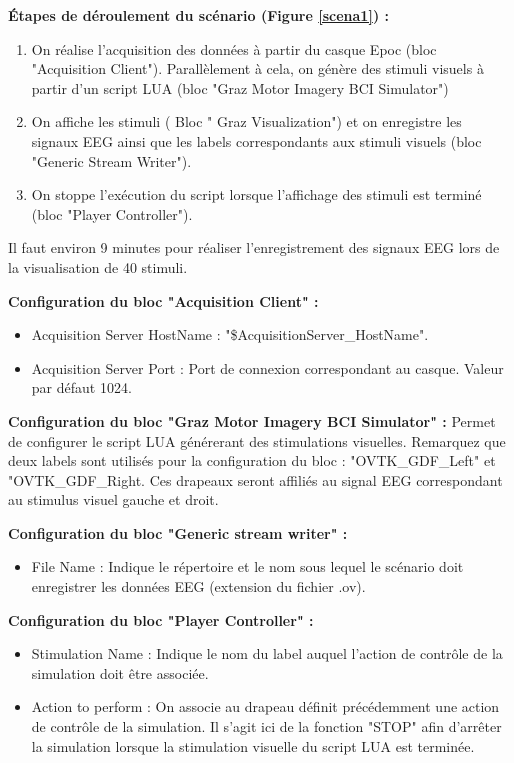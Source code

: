 \smallbreak
\textbf{Étapes de déroulement du scénario (Figure \ref{scena1}) : }
\smallbreak
\begin{enumerate}
	\item On réalise l'acquisition des données à partir du casque Epoc (bloc "Acquisition Client"). Parallèlement à cela, on génère des stimuli visuels à partir d'un script LUA (bloc "Graz Motor Imagery BCI Simulator")
	\smallbreak
	\item On affiche les stimuli ( Bloc " Graz Visualization") et on enregistre les signaux EEG ainsi que les labels correspondants aux stimuli visuels (bloc "Generic Stream Writer").
	\smallbreak
	\item On stoppe l'exécution du script lorsque l'affichage des stimuli est terminé (bloc "Player Controller"). 
\end{enumerate}

Il faut environ 9 minutes pour réaliser l'enregistrement des signaux EEG lors de la visualisation de 40 stimuli.

\smallbreak
\textbf{Configuration du bloc "Acquisition Client" : }
\smallbreak
\begin{itemize}
	\item Acquisition Server HostName : "\${AcquisitionServer\_HostName}".
	\smallbreak
	\item Acquisition Server Port : Port de connexion correspondant au casque. Valeur par défaut 1024.
\end{itemize}

\textbf{Configuration du bloc "Graz Motor Imagery BCI Simulator" : }
\smallbreak
 Permet de configurer le script LUA générerant des stimulations visuelles. Remarquez que deux labels sont utilisés pour la configuration du bloc : "OVTK\_GDF\_Left" et "OVTK\_GDF\_Right. Ces drapeaux seront affiliés au signal EEG correspondant au stimulus visuel gauche et droit.

\textbf{Configuration du bloc "Generic stream writer" : }
\smallbreak
\begin{itemize}
	\item File Name : Indique le répertoire et le nom sous lequel le scénario doit enregistrer les données EEG (extension du fichier .ov).
\end{itemize}

\textbf{Configuration du bloc "Player Controller" : }
\smallbreak
\begin{itemize}
	\item Stimulation Name : Indique le nom du label auquel l'action de contrôle de la simulation doit être associée.
	\smallbreak
	\item Action to perform : On associe au drapeau définit précédemment une action de contrôle de la simulation. Il s'agit ici de la fonction "STOP" afin d'arrêter la simulation lorsque la stimulation visuelle du script LUA est terminée.
\end{itemize}

